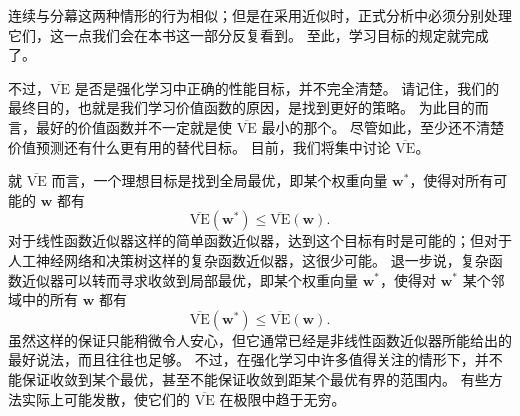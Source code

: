 \documentclass[UTF8,12pt,a4paper,fontset=fandol]{ctexart}
\begin{document}
\begin{center}
\end{center}

连续与分幕这两种情形的行为相似；但是在采用近似时，正式分析中必须分别处理它们，这一点我们会在本书这一部分反复看到。
至此，学习目标的规定就完成了。

不过，$\overline{\mathrm{VE}}$ 是否是强化学习中正确的性能目标，并不完全清楚。
请记住，我们的最终目的，也就是我们学习价值函数的原因，是找到更好的策略。
为此目的而言，最好的价值函数并不一定就是使 $\overline{\mathrm{VE}}$ 最小的那个。
尽管如此，至少还不清楚价值预测还有什么更有用的替代目标。
目前，我们将集中讨论 $\overline{\mathrm{VE}}$。

就 $\overline{\mathrm{VE}}$ 而言，一个理想目标是找到全局最优，即某个权重向量 $\mathbf{w}^*$，使得对所有可能的 $\mathbf{w}$ 都有
\[
\overline{\mathrm{VE}}(\mathbf{w}^*)\le \overline{\mathrm{VE}}(\mathbf{w}).
\]
对于线性函数近似器这样的简单函数近似器，达到这个目标有时是可能的；但对于人工神经网络和决策树这样的复杂函数近似器，这很少可能。
退一步说，复杂函数近似器可以转而寻求收敛到局部最优，即某个权重向量 $\mathbf{w}^*$，使得对 $\mathbf{w}^*$ 某个邻域中的所有 $\mathbf{w}$ 都有
\[
\overline{\mathrm{VE}}(\mathbf{w}^*)\le \overline{\mathrm{VE}}(\mathbf{w}).
\]
虽然这样的保证只能稍微令人安心，但它通常已经是非线性函数近似器所能给出的最好说法，而且往往也足够。
不过，在强化学习中许多值得关注的情形下，并不能保证收敛到某个最优，甚至不能保证收敛到距某个最优有界的范围内。
有些方法实际上可能发散，使它们的 $\overline{\mathrm{VE}}$ 在极限中趋于无穷。
\end{document}
